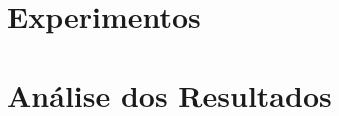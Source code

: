 \section{Experimentos}
\label{sec:met-Experimentos}


\section{Análise dos Resultados}
\label{sec:met-analise}













